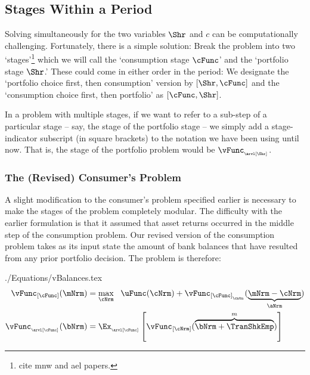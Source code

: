 \documentclass[\econtexRoot/SolvingMicroDSOPs]{subfiles}
\begin{document}
\hypertarget{stages-within-a-period}{}
\subsection{{Stage}s Within a {Period}}\label{subsec:stageswithin}

Solving simultaneously for the two variables $\Shr$ and $c$ can be computationally challenging.  Fortunately, there is a simple solution: Break the problem into two `{stage}s'\footnote{cite mnw and ael papers.} 
which we will call the `consumption {stage} $\cFunc$' and the `portfolio {stage} $\Shr$.'  These could come in either order in the {period}: We designate the `portfolio choice first, then consumption' version by $[\Shr,\cFunc]$ and the `consumption choice first, then portfolio' as $[\cFunc,\Shr]$.

In a problem with multiple {stages}, if we want to refer to a sub-{step} of a particular {stage} -- say, the {\Arrival} {stage} of the portfolio {stage} -- we simply add a {stage}-indicator subscript (in square brackets) to the notation we have been using until now.  That is, the {\Arrival} {stage} of the portfolio problem would be $\vFunc_{_\arvl[\Shr]}$.

\hypertarget{revised-consumers-problem}{}
\subsubsection{The (Revised) Consumer's Problem}\label{subsubsec:revised-consumers-problem}

A slight modification to the consumer's problem specified earlier is necessary to make the {stage}s of the problem completely modular.  The difficulty with the earlier formulation is that it assumed that asset returns occurred in the middle {step} of the consumption problem.  Our revised version of the consumption problem takes as its input state the amount of bank balances that have resulted from any prior portfolio decision.  The problem is therefore:
\begin{verbatimwrite}{./Equations/vBalances.tex}
  \begin{equation}\begin{gathered}\begin{aligned}
 \vFunc_{[\cFunc]}(\mNrm) & =  \max_{\cNrm} ~~ \uFunc(\cNrm)+  \vFunc_{[\cFunc]_{_\cntn}}(\underbrace{\mNrm-\cNrm}_{\aNrm})             
\\    \vFunc_{_\arvl[\cFunc]}(\bNrm) & = \Ex_{_\arvl[\cFunc]}\left[\vFunc_{[\cNrm]}(\overbrace{\bNrm+\TranShkEmp}^{m})\right] \label{eq:vBalances}
      \end{aligned}\end{gathered}\end{equation}
\end{verbatimwrite}
\unskip
\end{document}
